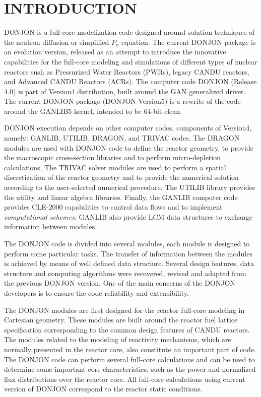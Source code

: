 \section{INTRODUCTION}\label{sect:intro}

DONJON is a full-core modelization code designed around solution techniques of 
the neutron diffusion or simplified $P_n$ equation.\cite{PIP2016}
The current DONJON package is an evolution version, released as an attempt
to introduce the innovative capabilities for the full-core modeling and simulations
of different types of nuclear reactors sush as Pressurized Water Reactors (PWRs),
legacy CANDU reactors, and Advanced CANDU Reactors (ACRs). The computer code DONJON (Release 4.0)
is part of Version4 distribution\cite{v4}, built around the GAN generalized driver\cite{gan1}.
The current DONJON package (DONJON Version5) is a rewrite of the code around the GANLIB5
kernel\cite{ganlib5}, intended to be 64-bit clean.

DONJON execution depends on other computer codes, components of Version4,
namely: GANLIB, UTILIB, DRAGON\cite{dragon}, and TRIVAC\cite{trivac}
codes. The DRAGON modules are used with DONJON code to define the reactor
geometry, to provide the macroscopic cross-section libraries and to perform
micro-depletion calculations. The TRIVAC
solver modules are used to perform a spatial discretization of the reactor geometry
and to provide the numerical solution according to the user-selected numerical
procedure\cite{ah1,ah2,ah3,ah4,ah5,ah6}.
The UTILIB library provides the utility and linear algebra libraries.
Finally, the GANLIB computer code provides CLE-2000 capabilities to control
data flows and to implement {\sl computational schemes}. GANLIB also provide
LCM data structures to exchange information between modules.

The DONJON code is divided into several modules, each module is designed
to perform some particular tasks. The transfer of information between the modules
is achieved by means of well defined data structure. Several design features,
data structure and computing algorithms were recovered, revised and adapted
from the previous DONJON version\cite{donjon,donjstruc}. One of the main
concerns of the DONJON developers is to ensure the code reliability and extensibility.

The DONJON modules are first designed for the reactor full-core modeling in
 Cartesian geometry. These modules are built around the reactor fuel
lattice specification corresponding to the common design features of CANDU
reactors. The modules related to the modeling of reactivity mechanisms, which are
normally presented in the reactor core, also constitute an important part of code.
The DONJON code can perform several full-core calculations and can be used
to determine some important core characteristics, such as the power and normalized
flux distributions over the reactor core. All full-core calculations using current version
of DONJON correspond to the reactor static conditions.


